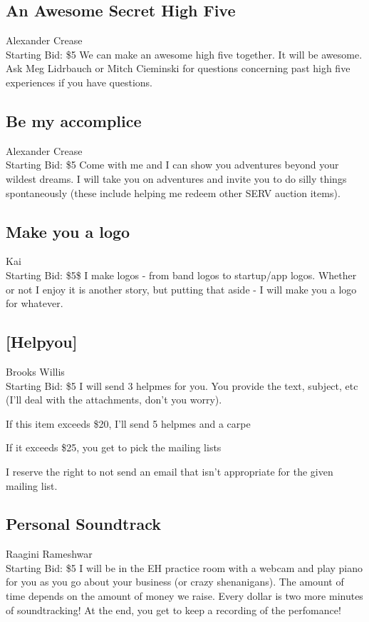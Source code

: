 \documentclass[11pt]{article}
\begin{document}
\subsection{An Awesome Secret High Five}
Alexander Crease
\\
Starting Bid: \$5
\newline
We can make an awesome high five together. It will be awesome.
Ask Meg Lidrbauch or Mitch Cieminski for questions concerning past high five experiences if you have questions.
\subsection{Be my accomplice}
Alexander Crease
\\
Starting Bid: \$5
\newline
Come with me and I can show you adventures beyond your wildest dreams. I will take you on adventures and invite you to do silly things spontaneously (these include helping me redeem other SERV auction items).
\subsection{Make you a logo}
Kai
\\
Starting Bid: \$5\$
\newline
I make logos - from band logos to startup/app logos. Whether or not I enjoy it is another story, but putting that aside - I will make you a logo for whatever.
\subsection{[Helpyou]}
Brooks Willis
\\
Starting Bid: \$5
\newline
I will send 3 helpmes for you. You provide the text, subject, etc (I'll deal with the attachments, don't you worry). 

If this item exceeds \$20, I'll send 5 helpmes and a carpe

If it exceeds \$25, you get to pick the mailing lists

I reserve the right to not send an email that isn't appropriate for the given mailing list.
\subsection{Personal Soundtrack}
Raagini Rameshwar
\\
Starting Bid: \$5
\newline
I will be in the EH practice room with a webcam and play piano for you as you go about your business (or crazy shenanigans). The amount of time depends on the amount of money we raise. Every dollar is two more minutes of soundtracking! At the end, you get to keep a recording of the perfomance!
\end{document}
